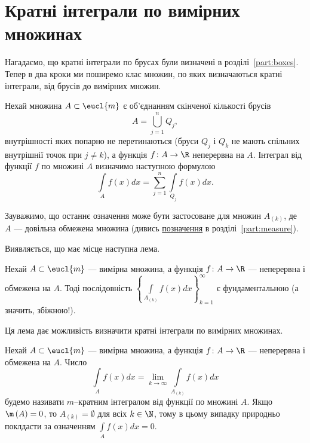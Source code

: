 \section{Кратні інтеграли по вимірних множинах}
Нагадаємо, що кратні інтеграли по брусах були визначені в розділі~\ref{part:boxes}. Тепер в два кроки ми поширемо клас множин, по яких визначаються кратні інтеграли, від брусів до вимірних множин.
\begin{definition}
Нехай множина ${A\subset\eucl{m}}$ є об'єднанням скінченої кількості брусів
\[
A = \bigcup\limits_{j=1}^nQ_j,
\]
внутрішності яких попарно не перетинаються  (бруси ${Q_j}$ і ${Q_k }$ не мають спільних внутрішнії точок при ${j\neq k}$), а функція ${f\colon A\to \R}$ неперервна на $A$. Інтеграл від функції $f$ по множині $A$ визначимо наступною формулою
\[
\int\limits_Af(x) d x = \sum\limits_{j=1}^n\int\limits_{Q_j}f(x) d x.
\]
\end{definition}
\begin{remark}
Зауважимо, що останнє означення може бути застосоване для множин ${A_{(k)}}$, де $A$ --- довільна обмежена множина (дивись \hyperref[partition_sets]{позначення} в розділі~\ref{part:measure}).
\end{remark}
Виявляється, що має місце наступна лема.
\begin{lemma}
Нехай ${A\subset\eucl{m}}$ --- вимірна множина, а функція ${f\colon A\to\R}$ --- неперервна і обмежена на ${A}$. Тоді послідовність ${\left\{\int\limits_{A_{(k)}}f(x) d x\right\}_{k=1}^\infty}$ є фундаментальною (а значить, збіжною!).
\end{lemma}
Ця лема дає можливість визначити кратні інтеграли по вимірних множинах.
\begin{definition}
Нехай ${A\subset\eucl{m}}$ --- вимірна множина, а функція ${f\colon A\to\R}$ --- неперервна і обмежена на ${A}$. Число
\[
\int\limits_{A}f(x) d x = \lim\limits_{k\to\infty}\int\limits_{A_{(k)}}f(x) d x
\]
будемо називати ${m}$--кратним інтегралом від функції  по множині ${A}$. Якщо ${\m\left(A\right) = 0}$, то ${A_{(k)} = \emptyset}$ для всіх ${k\in\N}$, тому в цьому випадку природньо поклдасти за означенням ${\int\limits_{A}f(x) d x = 0}$.
\end{definition}
